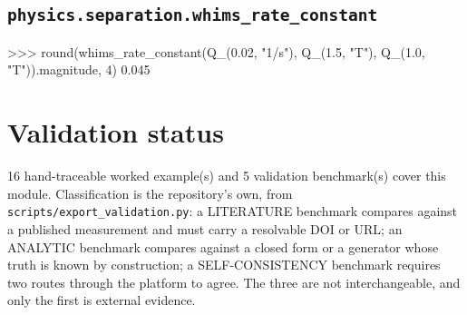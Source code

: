 \documentclass[10pt,a4paper,twoside]{report}
\begin{document}
\subsection*{\texttt{physics.separation.whims\_rate\_constant}}

\begin{doctestblock}
>>> round(whims_rate_constant(Q_(0.02, "1/s"), Q_(1.5, "T"), Q_(1.0, "T")).magnitude, 4)
0.045
\end{doctestblock}

\section{Validation status}

16 hand-traceable worked example(s) and 5 validation benchmark(s) cover this module. Classification is the repository's own, from \texttt{scripts/export\_validation.py}: a LITERATURE benchmark compares against a published measurement and must carry a resolvable DOI or URL; an ANALYTIC benchmark compares against a closed form or a generator whose truth is known by construction; a SELF-CONSISTENCY benchmark requires two routes through the platform to agree. The three are not interchangeable, and only the first is external evidence.

\footnotesize
\end{document}
